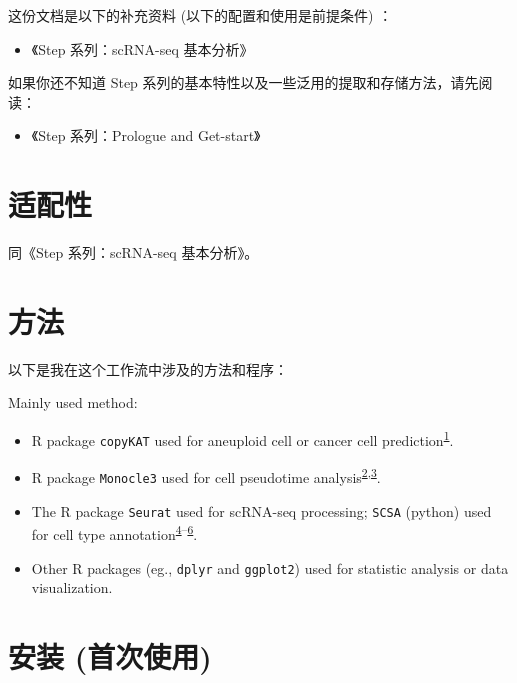 \documentclass[
]{article}
\providecommand{\tightlist}{%
  \setlength{\itemsep}{0pt}\setlength{\parskip}{0pt}}
\begin{document}
这份文档是以下的补充资料 (以下的配置和使用是前提条件) ：

\begin{itemize}
\tightlist
\item
  《Step 系列：scRNA-seq 基本分析》
\end{itemize}

如果你还不知道 Step 系列的基本特性以及一些泛用的提取和存储方法，请先阅读：

\begin{itemize}
\tightlist
\item
  《Step 系列：Prologue and Get-start》
\end{itemize}

\hypertarget{ux9002ux914dux6027}{%
\section{适配性}\label{ux9002ux914dux6027}}

同《Step 系列：scRNA-seq 基本分析》。

\hypertarget{ux65b9ux6cd5}{%
\section{方法}\label{ux65b9ux6cd5}}

以下是我在这个工作流中涉及的方法和程序：

Mainly used method:

\begin{itemize}
\tightlist
\item
  R package \texttt{copyKAT} used for aneuploid cell or cancer cell prediction\textsuperscript{\protect\hyperlink{ref-DelineatingCopGaoR2021}{1}}.
\item
  R package \texttt{Monocle3} used for cell pseudotime analysis\textsuperscript{\protect\hyperlink{ref-ReversedGraphQiuX2017}{2},\protect\hyperlink{ref-TheDynamicsAnTrapne2014}{3}}.
\item
  The R package \texttt{Seurat} used for scRNA-seq processing; \texttt{SCSA} (python) used for cell type annotation\textsuperscript{\protect\hyperlink{ref-IntegratedAnalHaoY2021}{4}--\protect\hyperlink{ref-ScsaACellTyCaoY2020}{6}}.
\item
  Other R packages (eg., \texttt{dplyr} and \texttt{ggplot2}) used for statistic analysis or data visualization.
\end{itemize}

\hypertarget{ux5b89ux88c5-ux9996ux6b21ux4f7fux7528}{%
\section{安装 (首次使用)}\label{ux5b89ux88c5-ux9996ux6b21ux4f7fux7528}}
\end{document}
